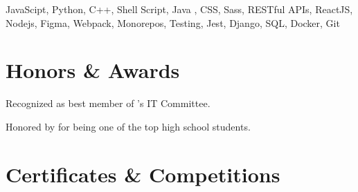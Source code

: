 \documentclass[legalpaper, oneside, final]{scrartcl}
\begin{document}
\begin{center}
%
%

\parbox{\linewidth} {
JavaScipt, Python, C++, Shell Script, Java , CSS, Sass, RESTful APIs, ReactJS, Nodejs, Figma, Webpack, Monorepos, Testing, Jest, Django, SQL, Docker, Git
}


\section{Honors \& Awards}

\begin{datelist}
    {Recognized as best member of 's IT Committee.}

    {Honored by  for being one of the top high school students.}
\end{datelist}



\section{Certificates \& Competitions}


\end{center}
\end{document}
